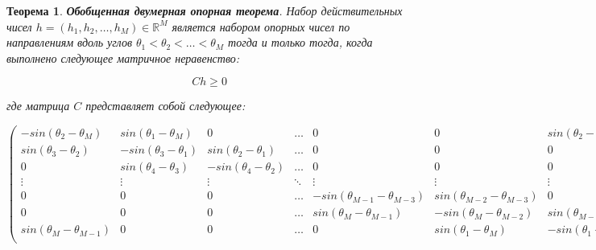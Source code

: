 \documentclass[a4paper, 12pt, titlepage]{article}
\theoremstyle{definition}
\theoremstyle{plain}
\newtheorem{SmartTheorem}{Теорема}
\theoremstyle{plain}
\begin{document}
\begin{SmartTheorem}
 \label{thm:ext-support-theorem-2d}
 \textbf{Обобщенная двумерная опорная теорема}.
 Набор действительных чисел
 $h = (h_{1}, h_{2}, \ldots, h_{M}) \in \mathbb{R}^{M}$
 является набором опорных чисел по направлениям вдоль углов
 $\theta_{1} < \theta_{2} < \ldots < \theta_{M}$ тогда и только тогда, когда
 выполнено следующее матричное неравенство:

 \begin{equation}
 C h \geq 0
 \end{equation}

 где матрица $C$ представляет собой следующее:

 \begin{equation}
  \left(
  \begin{array}{ccccccc}

   \scriptstyle     -sin(\theta_{2} - \theta_{M}) &
   \scriptstyle     sin(\theta_{1} - \theta_{M}) &
   \scriptstyle     0 &
   \scriptstyle     \ldots &
   \scriptstyle     0 &
   \scriptstyle     0 &
   \scriptstyle     sin(\theta_{2} - \theta_{1}) \\

   \scriptstyle      sin(\theta_{3} - \theta_{2}) &
   \scriptstyle      -sin(\theta_{3} - \theta_{1}) &
   \scriptstyle      sin(\theta_{2} - \theta_{1}) &
   \scriptstyle      \ldots &
   \scriptstyle      0 &
   \scriptstyle      0 &
   \scriptstyle      0 \\

   \scriptstyle      0 &
   \scriptstyle      sin(\theta_{4} - \theta_{3}) &
   \scriptstyle      -sin(\theta_{4} - \theta_{2}) &
   \scriptstyle      \ldots &
   \scriptstyle      0 &
   \scriptstyle      0 &
   \scriptstyle      0 \\

   \scriptstyle      \vdots &
   \scriptstyle      \vdots &
   \scriptstyle      \vdots &
   \scriptstyle      \ddots &
   \scriptstyle      \vdots &
   \scriptstyle      \vdots &
   \scriptstyle      \vdots \\

   \scriptstyle      0 &
   \scriptstyle      0 &
   \scriptstyle      0 &
   \scriptstyle      \ldots &
   \scriptstyle      -sin(\theta_{M - 1} - \theta_{M - 3}) &
   \scriptstyle      sin(\theta_{M - 2} - \theta_{M - 3}) &
   \scriptstyle      0 \\

   \scriptstyle      0 &
   \scriptstyle      0 &
   \scriptstyle      0 &
   \scriptstyle      \ldots &
   \scriptstyle      sin(\theta_{M} - \theta_{M - 1}) &
   \scriptstyle      -sin(\theta_{M} - \theta_{M - 2}) &
   \scriptstyle      sin(\theta_{M - 1} - \theta_{M - 2}) \\

   \scriptstyle      sin(\theta_{M} - \theta_{M - 1}) &
   \scriptstyle      0 &
   \scriptstyle      0 &
   \scriptstyle      \ldots &
   \scriptstyle      0 &
   \scriptstyle      sin(\theta_{1} - \theta_{M}) &
   \scriptstyle      -sin(\theta_{1} - \theta_{M - 1}) \\
  \end{array}
  \right)
 \end{equation}
\end{SmartTheorem}
\end{document}

